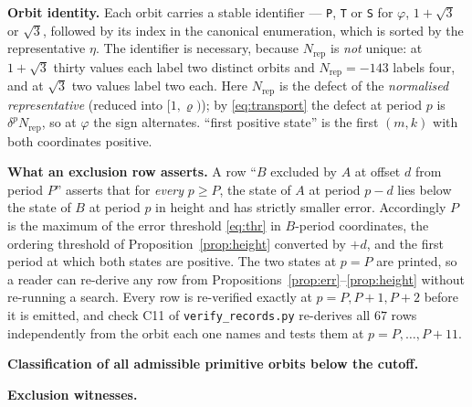 \documentclass[11pt]{article}
\theoremstyle{definition}
\theoremstyle{remark}
\newcommand{\pr}{\varrho}
\begin{document}
\textbf{Orbit identity.} Each orbit carries a stable identifier --- \texttt{P}, \texttt{T} or
\texttt{S} for $\varphi$, $1+\sqrt3$ or $\sqrt3$, followed by its index in the canonical
enumeration, which is sorted by the representative $\eta$. The identifier is necessary, because
$N_{\mathrm{rep}}$ is \emph{not} unique: at $1+\sqrt3$ thirty values each label two distinct
orbits and $N_{\mathrm{rep}}=-143$ labels four, and at $\sqrt3$ two values label two each.
Here $N_{\mathrm{rep}}$ is the defect of the \emph{normalised representative} (reduced into
$[1,\pr)$); by \eqref{eq:transport} the defect at period $p$ is $\delta^pN_{\mathrm{rep}}$, so
at $\varphi$ the sign alternates. ``first positive state'' is the first $(m,k)$ with both
coordinates positive.

\textbf{What an exclusion row asserts.} A row ``$B$ excluded by $A$ at offset $d$ from period
$P$'' asserts that for \emph{every} $p\ge P$, the state of $A$ at period $p-d$ lies below the
state of $B$ at period $p$ in height and has strictly smaller error. Accordingly $P$ is the
maximum of the error threshold \eqref{eq:thr} in $B$-period coordinates, the ordering threshold
of Proposition~\ref{prop:height} converted by $+d$, and the first period at which both states
are positive. The two states at $p=P$ are printed, so a reader can re-derive any row from
Propositions~\ref{prop:err}--\ref{prop:height} without re-running a search. Every row is
re-verified exactly at $p=P,P+1,P+2$ before it is emitted, and check C11 of
\texttt{verify\_records.py} re-derives all $67$ rows independently from the orbit each one
names and tests them at $p=P,\dots,P+11$.

\bigskip
\noindent\textbf{Classification of all admissible primitive orbits below the cutoff.}
{\small}

\bigskip
\noindent\textbf{Exclusion witnesses.}
{\small}
\end{document}
